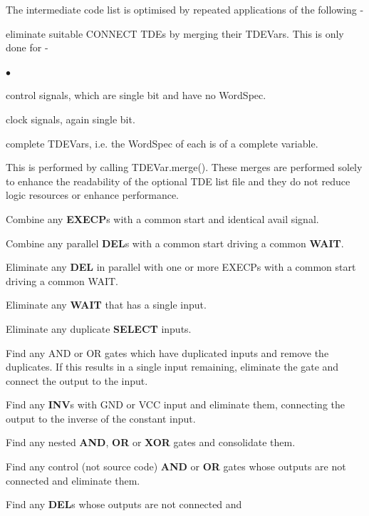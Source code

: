 \documentclass[10pt,a4paper,twoside,fleqn]{book}
\newcommand{\blist}{\begin{list}{$\bullet$}{\setlength{\itemsep}{-5pt}\setlength{\topsep}{-5pt}}}
\newcommand{\blend}{\end{list}}
\begin{document}
        The intermediate code list is optimised by repeated applications of
        the following -
        \begin{enumerate}
        \item   eliminate suitable CONNECT TDEs by merging their TDEVars.
                This is only done for -
                \blist
                \item   control signals, which are single bit and have no
                        WordSpec.
                \item   clock signals, again single bit.
                \item   complete TDEVars, i.e. the WordSpec of each is of
                        a complete variable.
                \blend
                This is performed by calling TDEVar.merge(). These merges are
                performed solely to enhance the readability of the optional
                TDE list file and they do not reduce logic resources or
                enhance performance.
        \item   Combine any {\bf EXECP}s with a common start and identical avail
                signal.
        \item   Combine any parallel {\bf DEL}s with a common start
                driving a common {\bf WAIT}.
        \item   Eliminate any {\bf DEL} in parallel with one or more EXECPs with
                a common start driving a common WAIT.
        \item   Eliminate any {\bf WAIT} that has a single input.
        \item   Eliminate any duplicate {\bf SELECT} inputs.
        \item   Find any AND or OR gates which have duplicated inputs
                and remove the duplicates. If this results in a single
                input remaining, eliminate the gate and connect
                the output to the input.
        \item   Find any {\bf INV}s with GND or VCC input and eliminate
                them, connecting the output to the inverse of the constant
                input.
        \item   Find any nested {\bf AND}, {\bf OR} or {\bf XOR} gates and
                consolidate them.
        \item   Find any control (not source code) {\bf AND} or {\bf OR} gates
                whose outputs are not connected and eliminate them.
        \item   Find any {\bf DEL}s whose outputs are not connected and

\end{enumerate}
\end{document}
